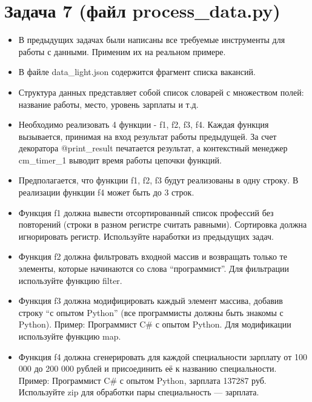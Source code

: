 \documentclass[20pt,a4paper]{report}
\begin{document}
		\section{Задача 7 (файл process\_data.py)}
		\begin{itemize}
			\item  В предыдущих задачах были написаны все требуемые инструменты для работы с данными. Применим их на реальном примере.

			\item В файле data\_light.json содержится фрагмент списка вакансий.

			\item Структура данных представляет собой список словарей с множеством полей: название работы, место, уровень зарплаты и т.д.

			\item Необходимо реализовать 4 функции - f1, f2, f3, f4. Каждая функция вызывается, принимая на вход результат работы предыдущей. За счет декоратора @print\_result печатается результат, а контекстный менеджер cm\_timer\_1 выводит время работы цепочки функций.

			\item Предполагается, что функции f1, f2, f3 будут реализованы в одну строку. В реализации функции f4 может быть до 3 строк.

			\item Функция f1 должна вывести отсортированный список профессий без повторений (строки в разном регистре считать равными). Сортировка должна игнорировать регистр. Используйте наработки из предыдущих задач.

			\item Функция f2 должна фильтровать входной массив и возвращать только те элементы, которые начинаются со слова “программист”. Для фильтрации используйте функцию filter.

			\item Функция f3 должна модифицировать каждый элемент массива, добавив строку “с опытом Python” (все программисты должны быть знакомы с Python). Пример: Программист C\# с опытом Python. Для модификации используйте функцию map.

			\item Функция f4 должна сгенерировать для каждой специальности зарплату от 100 000 до 200 000 рублей и присоединить её к названию специальности. Пример: Программист C\# с опытом Python, зарплата 137287 руб. Используйте zip для обработки пары специальность — зарплата.
		\end{itemize}
		
\end{document}
